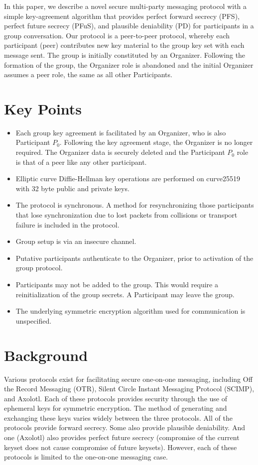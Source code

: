 \documentclass[%
preprint,
amsmath,amssymb,
aps,
prb,
floatfix,
]{revtex4-1}
\begin{document}
In this paper, we describe a novel secure multi-party messaging protocol with a
simple key-agreement algorithm that provides perfect forward secrecy (PFS),
perfect future secrecy (PFuS),
and plausible deniability (PD) for participants in a group conversation. Our protocol
is a peer-to-peer protocol, whereby each
participant (peer) contributes new
key material to the group key set with each message sent. The group is
initially constituted by an Organizer. Following the formation of the group, the
Organizer role is abandoned and the initial Organizer assumes a peer role, the
same as all other Participants.

\section{\label{sec:keypoints}Key Points}
\begin{itemize}
\item Each group key agreement is facilitated by an Organizer, who is also
Participant $P_0$. Following the key agreement stage, the Organizer is no longer
required. The Organizer data is securely deleted and the Participant
$P_0$ role is that of a peer like any other
participant.
\item Elliptic curve Diffie-Hellman key operations are performed on curve25519
with 32 byte
public and private keys.
\item The protocol is synchronous. A method for resynchronizing those
participants that lose synchronization due to lost packets from collisions or
transport failure is included in the protocol.
\item Group setup is via an insecure channel.
\item Putative participants authenticate to the Organizer, prior to
activation of the group protocol.
\item Participants may not be added to the group. This would
require a reinitialization of the group secrets. A Participant may leave the
group.
\item The underlying symmetric encryption algorithm used for communication is
unspecified.
\end{itemize}

\section{\label{sec:background}Background}
Various protocols exist for facilitating secure one-on-one messaging, including
Off the Record Messaging (OTR)\cite{ref:otr1,ref:otr2,ref:otr3,ref:otr}, Silent Circle Instant Messaging Protocol
(SCIMP)\cite{ref:scimp}, and Axolotl\cite{ref:axolotl}. Each of these protocols
provides security through the use of ephemeral keys for symmetric encryption.
The method of generating and exchanging these keys varies widely between the
three protocols. All of the protocols provide forward
secrecy. Some also provide plausible deniability. And one (Axolotl) also
provides perfect future secrecy (compromise of the current keyset does not cause
compromise of future keysets). However, each of these protocols is limited to
the one-on-one messaging case.
\end{document}
